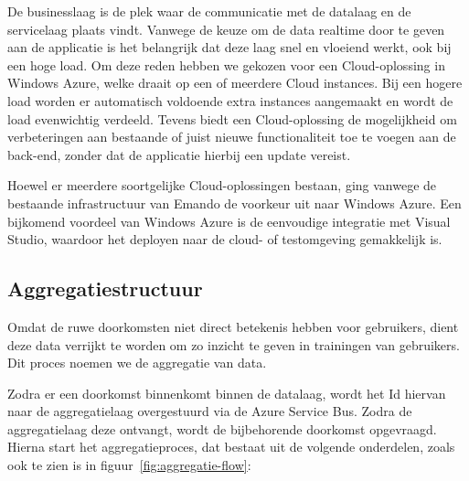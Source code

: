 De businesslaag is de plek waar de communicatie met de datalaag en de servicelaag plaats vindt. Vanwege de keuze om de data realtime door te geven aan de applicatie is het belangrijk dat deze laag snel en vloeiend werkt, ook bij een hoge load. Om deze reden hebben we gekozen voor een Cloud-oplossing in Windows Azure, welke draait op een of meerdere Cloud instances. Bij een hogere load worden er automatisch voldoende extra instances aangemaakt en wordt de load evenwichtig verdeeld. Tevens biedt een Cloud-oplossing de mogelijkheid om verbeteringen aan bestaande of juist nieuwe functionaliteit toe te voegen aan de back-end, zonder dat de applicatie hierbij een update vereist.

Hoewel er meerdere soortgelijke Cloud-oplossingen bestaan, ging vanwege de bestaande infrastructuur van Emando de voorkeur uit naar Windows Azure. Een bijkomend voordeel van Windows Azure is de eenvoudige integratie met Visual Studio, waardoor het deployen naar de cloud- of testomgeving gemakkelijk is.

\subsection{Aggregatiestructuur}

Omdat de ruwe doorkomsten niet direct betekenis hebben voor gebruikers, dient deze data verrijkt te worden om zo inzicht te geven in trainingen van gebruikers. Dit proces noemen we de aggregatie van data.

Zodra er een doorkomst binnenkomt binnen de datalaag, wordt het Id hiervan naar de aggregatielaag overgestuurd via de Azure Service Bus. Zodra de aggregatielaag deze ontvangt, wordt de bijbehorende doorkomst opgevraagd. Hierna start het aggregatieproces, dat bestaat uit de volgende onderdelen, zoals ook te zien is in figuur~\ref{fig:aggregatie-flow}:

